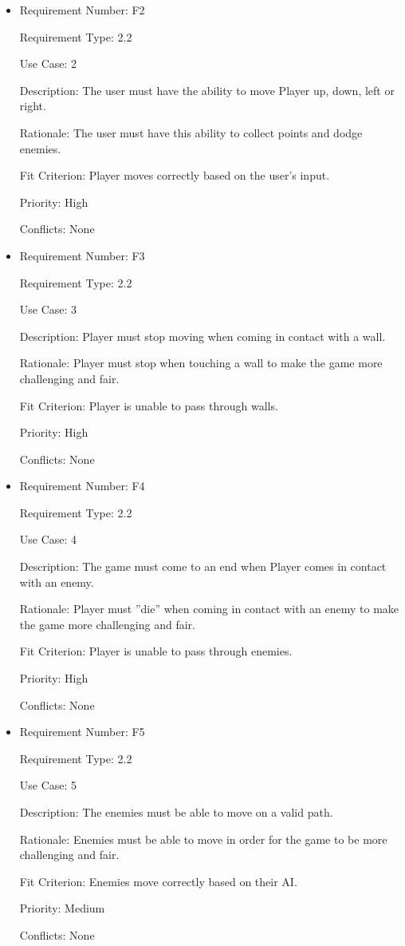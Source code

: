 \documentclass[12pt, titlepage]{article}
\begin{document}
\begin{itemize}
\item
Requirement Number: F2

Requirement Type: 2.2

Use Case: 2

Description: The user must have the ability to move Player up, down, left or right.

Rationale: The user must have this ability to collect points and dodge enemies.

Fit Criterion: Player moves correctly based on the user’s input.

Priority: High

Conflicts: None
\end{itemize}

\begin{itemize}
\item
Requirement Number: F3 

Requirement Type: 2.2

Use Case: 3

Description: Player must stop moving when coming in contact with a wall.

Rationale: Player must stop when touching a wall to make the game more challenging and fair.

Fit Criterion: Player is unable to pass through walls.

Priority: High

Conflicts: None
\end{itemize}

\begin{itemize}
\item
Requirement Number: F4

Requirement Type: 2.2

Use Case: 4

Description: The game must come to an end when Player comes in contact with an enemy.

Rationale: Player must ''die'' when coming in contact with an enemy to make the game more challenging and fair.

Fit Criterion: Player is unable to pass through enemies.

Priority: High

Conflicts: None
\end{itemize}

\begin{itemize}
\item
Requirement Number: F5

Requirement Type: 2.2

Use Case: 5

Description: The enemies must be able to move on a valid path.

Rationale: Enemies must be able to move in order for the game to be more challenging and fair.

Fit Criterion: Enemies move correctly based on their AI.

Priority: Medium

Conflicts: None
\end{itemize}
\end{document}
